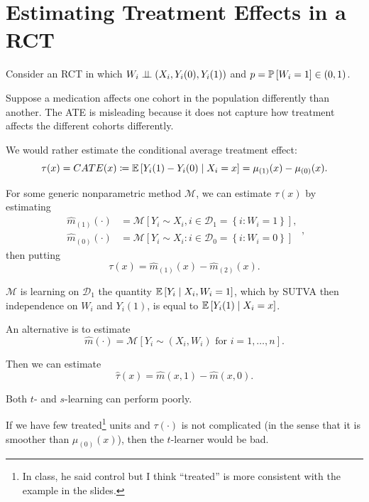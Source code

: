 \section{Estimating Treatment Effects in a RCT}


Consider an RCT in which $W_i \ind \left( X_i, Y_i(0), Y_i(1) \right)$ and $p = \P\left[W_i = 1\right] \in (0,1)$.

Suppose a medication affects one cohort in the population differently than another. The ATE is misleading because it does not capture how treatment affects the different cohorts differently.

We would rather estimate the conditional average treatment effect: \[
	\tau(x) = CATE(x) \coloneqq \E\left[Y_i(1) - Y_i(0) \mid X_i = x\right]  = \mu_{(1)}(x) - \mu_{(0)}(x)
.\] 
\begin{definition}[$t$-learner]
		For some generic nonparametric method $\mathscr{M}$, we can estimate $\tau(x)$ by estimating \[
			\begin{aligned}
				\hat{m}_{(1)} (\cdot ) &= \mathscr{M}\left[ Y_i \sim X_i, i \in \mathscr{D}_1 = \left\{i : W_i = 1\right\} \right], \\
				\hat{m}_{(0)}(\cdot ) &= \mathscr{M}\left[ Y_i \sim X_i: i \in \mathscr{D}_0 = \left\{i: W_i = 0\right\} \right]
			\end{aligned}
		,\] 
	then putting \[
		\tau(x) = \hat{m}_{(1)}(x) - \hat{m}_{(2)}(x)
	.\] 

	$\mathscr{M}$ is learning on $\mathscr{D}_1$ the quantity $\E\left[Y_i \mid X_i, W_i = 1\right] $, which by SUTVA then independence on $W_i$ and $Y_i(1)$, is equal to $\E\left[Y_i(1) \mid X_i = x\right] $.
\end{definition}

\begin{definition}[$s$-learner]
	An alternative is to estimate \[
		\hat{m}(\cdot ) = \mathscr{M}\left[ Y_i \sim (X_i,W_i) \text{ for }i = 1,\ldots,n \right]
	.\] 

	Then we can estimate \[
		\hat{\tau}(x) = \hat{m}(x,1) - \hat{m}(x,0)
	.\] 
\end{definition}

\begin{remark}
	Both $t$- and $s$-learning can perform poorly.

	If we have few treated\footnote{In class, he said control but I think ``treated'' is more consistent with the example in the slides.} units and $\tau(\cdot )$ is not complicated (in the sense that it is smoother than $\mu_{(0)}(x)$), then the $t$-learner would be bad.
\end{remark}

